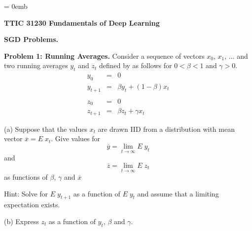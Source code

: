 \documentclass{article}
\newcommand{\solution}[1]{}
\begin{document}
\parindent = 0emb


\centerline{\bf TTIC 31230 Fundamentals of Deep Learning}
\bigskip
\centerline{\bf SGD Problems.}


\bigskip
{\bf Problem 1: Running Averages.}  Consider a sequence of vectors $x_0$, $x_1$, $\ldots$ and two running averages $y_t$ and $z_t$ defined by
as follows for $0 < \beta < 1$ and $\gamma > 0$.
\begin{eqnarray*}
  y_0 & = & 0 \\
  y_{t+1} & = & \beta y_t + (1-\beta) x_t
  \\
  \\
  z_0 & = & 0 \\
  z_{t+1} & = & \beta z_t + \gamma x_t
\end{eqnarray*}

(a) Suppose that the values $x_t$ are drawn IID from a distribution with mean vector $\overline{x} = E\;x_t$.  Give values for
$$\overline{y} = \lim_{t \rightarrow \infty} E \;y_t$$
and
$$\overline{z} = \lim_{t \rightarrow \infty} E \;z_t$$
as functions of $\beta$, $\gamma$ and $\overline{x}$

Hint: Solve for $E\;y_{t+1}$ as a function of $E\;y_t$ and assume that a limiting expectation exists.

\solution{
  \begin{eqnarray*}
   E\; y_{t+1} & = & \beta \;E\;y_t + (1-\beta) \; E\;x_t \\
   \overline{y} & = & \beta \;\overline{y} + (1-\beta)\; \overline{x} \\
   (1-\beta)\;\overline{y} & = & (1-\beta)\;\overline{x} \\
   \overline{y} & = & \overline{x}
  \end{eqnarray*}

  \begin{eqnarray*}
   E\; z_{t+1} & = & \beta \;E\;z_t + \gamma\; E\;x_t \\
   \overline{z} & = & \beta \;\overline{z} + \gamma\; \overline{x} \\
   (1-\beta)\;\overline{z} & = & \gamma\;\overline{x} \\
   \overline{z} & = & \frac{\gamma}{1-\beta}\;\overline{x}
  \end{eqnarray*}

}


(b) Express $z_t$ as a function of $y_t$, $\beta$ and $\gamma$.

\solution{
  \begin{eqnarray*}
    z_{t+1} & = & \beta \;z_t + \gamma\;x_t \\
    & = & \sum_{t'= 0}^t \gamma \beta^{t-t'} x_{t'} \\
    & = & \frac{\gamma}{1-\beta}\;\sum_{t'=0}^t (1-\beta)\beta^{t-t'} x_t \\
    & = & \frac{\gamma}{1-\beta}\;y_{t+1}
  \end{eqnarray*}
}
\end{document}
